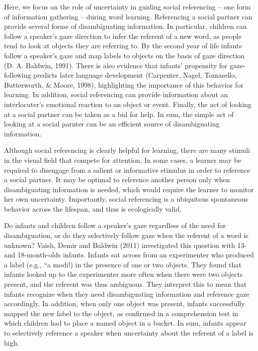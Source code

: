 \documentclass[10pt, letterpaper]{article}
\begin{document}
Here, we focus on the role of uncertainty in guiding social referencing
-- one form of information gathering -- during word learning.
Referencing a social partner can provide several forms of disambiguating
information. In particular, children can follow a speaker's gaze
direction to infer the referent of a new word, as people tend to look at
objects they are referring to. By the second year of life infants follow
a speaker's gaze and map labels to objects on the basis of gaze
direction (D. A. Baldwin, 1991). There is also evidence that infants'
propensity for gaze-following predicts later language development
(Carpenter, Nagel, Tomasello, Butterworth, \& Moore, 1998), highlighting
the importance of this behavior for learning. In addition, social
referencing can provide information about an interlocuter's emotional
reaction to an object or event. Finally, the act of looking at a social
partner can be taken as a bid for help. In sum, the simple act of
looking at a social parnter can be an efficient source of disambiguating
information.

Although social referencing is clearly helpful for learning, there are
many stimuli in the visual field that compete for attention. In some
cases, a learner may be required to disengage from a salient or
informative stimulus in order to reference a social partner. It may be
optimal to reference another person only when disambiguating information
is needed, which would require the learner to monitor her own
uncertainty. Importantly, social referencing is a ubiquitous spontaneous
behavior across the lifespan, and thus is ecologically valid.

Do infants and children follow a speaker's gaze regardless of the need
for disambiguation, or do they selectively follow gaze when the referent
of a word is unknown? Vaish, Demir and Baldwin (2011) investigated this
question with 13- and 18-month-olds infants. Infants sat across from an
experimenter who produced a label (e.g., ``a modi!) in the presence of
one or two objects. They found that infants looked up to the
experimenter more often when there were two objects present, and the
referent was thus ambiguous. They interpret this to mean that infants
recognize when they need disambiguating information and reference gaze
accordingly. In addition, when only one object was present, infants
successfully mapped the new label to the object, as confirmed in a
comprehension test in which children had to place a named object in a
bucket. In sum, infants appear to selectively reference a speaker when
uncertainty about the referent of a label is high.
\end{document}
